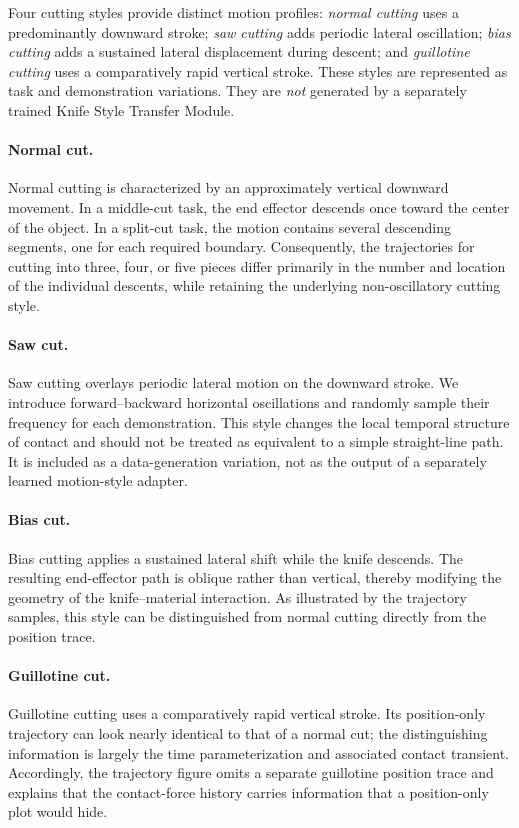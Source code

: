 Four cutting styles provide distinct motion profiles: \emph{normal cutting} uses a predominantly downward stroke; \emph{saw cutting} adds periodic lateral oscillation; \emph{bias cutting} adds a sustained lateral displacement during descent; and \emph{guillotine cutting} uses a comparatively rapid vertical stroke. These styles are represented as task and demonstration variations. They are \emph{not} generated by a separately trained Knife Style Transfer Module.

\paragraph*{Normal cut.}
Normal cutting is characterized by an approximately vertical downward movement. In a middle-cut task, the end effector descends once toward the center of the object. In a split-cut task, the motion contains several descending segments, one for each required boundary. Consequently, the trajectories for cutting into three, four, or five pieces differ primarily in the number and location of the individual descents, while retaining the underlying non-oscillatory cutting style.

\paragraph*{Saw cut.}
Saw cutting overlays periodic lateral motion on the downward stroke. We introduce forward--backward horizontal oscillations and randomly sample their frequency for each demonstration. This style changes the local temporal structure of contact and should not be treated as equivalent to a simple straight-line path. It is included as a data-generation variation, not as the output of a separately learned motion-style adapter.

\paragraph*{Bias cut.}
Bias cutting applies a sustained lateral shift while the knife descends. The resulting end-effector path is oblique rather than vertical, thereby modifying the geometry of the knife--material interaction. As illustrated by the trajectory samples, this style can be distinguished from normal cutting directly from the position trace.

\paragraph*{Guillotine cut.}
Guillotine cutting uses a comparatively rapid vertical stroke. Its position-only trajectory can look nearly identical to that of a normal cut; the distinguishing information is largely the time parameterization and associated contact transient. Accordingly, the trajectory figure omits a separate guillotine position trace and explains that the contact-force history carries information that a position-only plot would hide.

